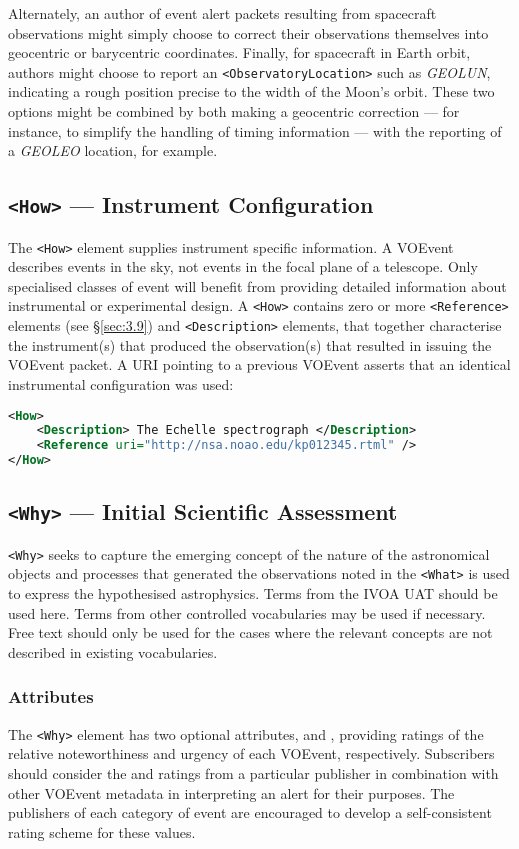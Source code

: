 \documentclass[11pt,a4paper]{ivoa}
\begin{document}
Alternately, an author of event alert packets resulting from spacecraft
observations might simply choose to correct their observations themselves into
geocentric or barycentric coordinates. Finally, for spacecraft in Earth orbit,
authors might choose to report an \verb|<ObservatoryLocation>| such as
\emph{GEOLUN}, indicating a rough position precise to the width of the Moon's
orbit. These two options might be combined by both making a geocentric
correction --- for instance, to simplify the handling of timing information ---
with the reporting of a \emph{GEOLEO} location, for example.

\subsection{\texttt{<How>} --- Instrument Configuration}
\label{sec:3.5}
The \verb|<How>| element supplies instrument specific information. A VOEvent
describes events in the sky, not events in the focal plane of a telescope. Only
specialised classes of event will benefit from providing detailed information
about instrumental or experimental design. A \verb|<How>| contains zero or more
\verb|<Reference>| elements (see \S\ref{sec:3.9}) and \verb|<Description>|
elements, that together characterise the instrument(s) that produced the
observation(s) that resulted in issuing the VOEvent packet. A URI pointing to a
previous VOEvent asserts that an identical instrumental configuration was used:
\begin{lstlisting}[language=XML]
<How>
    <Description> The Echelle spectrograph </Description>
    <Reference uri="http://nsa.noao.edu/kp012345.rtml" />
</How>
\end{lstlisting}

\subsection{\texttt{<Why>} --- Initial Scientific Assessment}
\label{sec:3.6}
\verb|<Why>| seeks to capture the emerging concept of the nature of the
astronomical objects and processes that generated the observations noted in the
\verb|<What>| is used to express the hypothesised astrophysics. Terms from
the IVOA UAT \citep{2022ivoa.spec.0722D} should be used here. Terms from other
controlled vocabularies may be used if necessary. Free text should only be used
for the cases where the relevant concepts are not described in existing vocabularies.

\subsubsection{Attributes}
The \verb|<Why>| element has two optional attributes, 
and , providing ratings of the relative noteworthiness and
urgency of each VOEvent, respectively. Subscribers should consider the
 and  ratings from a particular publisher
in combination with other VOEvent
metadata in interpreting an alert for their purposes. The publishers of each
category of event are encouraged to develop a self-consistent rating scheme for
these values.
\end{document}
